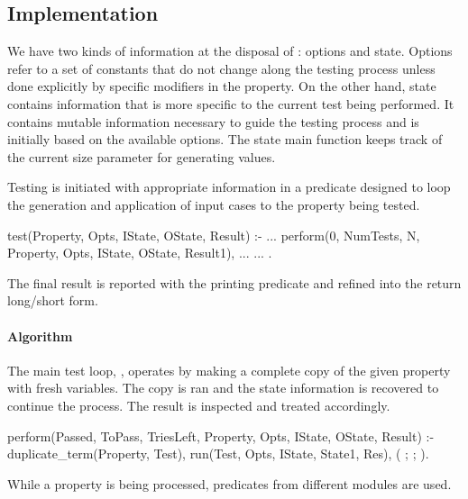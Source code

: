 \subsection{Implementation}


We have two kinds of information at the disposal of \plqc{}: options and
state.
%
Options refer to a set of constants that do not change along the testing
process unless done explicitly by specific modifiers in the property.
%
On the other hand, state contains information that is more specific to
the current test being performed.
%
It contains mutable information necessary to guide the testing process
and is initially based on the available options.
%
The state main function keeps track of the current size parameter
for generating values.


Testing is initiated with appropriate information in a predicate
designed to loop the generation and application of input cases to the
property being tested.
%
\begin{yapcode}
 test(Property, Opts,
      IState, OState, Result) :-
   ...
   perform(0, NumTests, N, Property, Opts,
           IState, OState, Result1),
   ...
   ...
 .
\end{yapcode}
%
The final result is reported with the printing predicate and refined
into the return long/short form.


\paragraph{Algorithm}

The main test loop, , operates by making a complete copy
of the given property with fresh variables.
%
The copy is ran and the state information is recovered to continue the
process.
%
The result is inspected and treated accordingly.
%
\begin{yapcode}
 perform(Passed, ToPass, TriesLeft, Property,
         Opts, IState, OState, Result) :-
   duplicate_term(Property, Test),
   run(Test, Opts, IState, State1, Res),
   (
   ;
   ;
   ).
\end{yapcode}While a property is being processed, predicates from different modules
are used.

